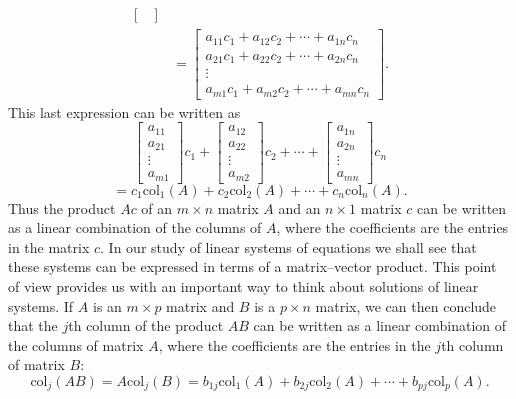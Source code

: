 \documentclass{report}
\begin{document}
\begin{itemize}
\begin{align*}
\begin{bmatrix}
                \end{bmatrix} \\
                &=\begin{bmatrix}
                    a_{11}c_1 + a_{12}c_2 + \cdots + a_{1n}c_n \\
                    a_{21}c_1 + a_{22}c_2 + \cdots + a_{2n}c_n \\
                    \vdots \\
                    a_{m1}c_1 + a_{m2}c_2 + \cdots + a_{mn}c_n
                \end{bmatrix}
            .\end{align*}
            This last expression can be written as
            \[
                \begin{bmatrix}
                    a_{11} \\
                    a_{21} \\
                    \vdots \\
                    a_{m1}
                \end{bmatrix}
                c_1
                +
                \begin{bmatrix}
                    a_{12} \\
                    a_{22} \\
                    \vdots \\
                    a_{m2}
                \end{bmatrix}
                c_2
                + \cdots +
                \begin{bmatrix}
                    a_{1n} \\
                    a_{2n} \\
                    \vdots \\
                    a_{mn}
                \end{bmatrix}
                c_n
            \]
            \[
                = c_1 \text{col}_1(A) + c_2 \text{col}_2(A) + \cdots + c_n \text{col}_n(A).
            \]
            \bigbreak \noindent 
            Thus the product $Ac$ of an $m \times n$ matrix $A$ and an $n \times 1$ matrix $c$ can be written as a linear combination of the columns of $A$, where the coefficients are the entries in the matrix $c$.
            \bigbreak \noindent 
            In our study of linear systems of equations we shall see that these systems can be expressed in terms of a matrix–vector product. This point of view provides us with an important way to think about solutions of linear systems.
            \bigbreak \noindent 
            If $A$ is an $m \times p$ matrix and $B$ is a $p \times n$ matrix, we can then conclude that the $j$th column of the product $AB$ can be written as a linear combination of the columns of matrix $A$, where the coefficients are the entries in the $j$th column of matrix $B$:
            \[
                \text{col}_j(AB) = A\text{col}_j(B) = b_{1j}\text{col}_1(A) + b_{2j}\text{col}_2(A) + \cdots + b_{pj}\text{col}_p(A).
            \]


\end{itemize}
\end{document}
